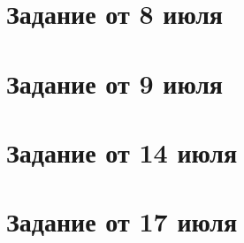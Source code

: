 \documentclass[twoside]{article}
\begin{document}




% 
% 


\section{Задание от 8 июля}


\section{Задание от 9 июля}


\section{Задание от 14 июля}


\section{Задание от 17 июля}

\end{document}

